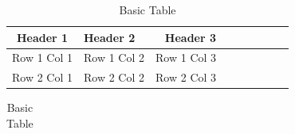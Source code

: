 \usepackage{tabularx}

\begin{table}[h] %
    
    \begin{tabular}{| %
            c| %
            l| %
            r| %
            p{3cm}| %
            m{3cm}| %
            b{3cm}| %
            >{\centering\arraybackslash}p{3cm}| %
            >{\raggedright\arraybackslash}p{3cm}| %
            >{\raggedleft\arraybackslash}p{3cm}| %
        }
        \hline %
        Header 1 & Header 2 & Header 3 \\ %
        \hline %
        Row 1 Col 1 & Row 1 Col 2 & Row 1 Col 3 \\ %
        Row 2 Col 1 & Row 2 Col 2 & Row 2 Col 3 \\ %
        \hline %
    \end{tabular}
    
    \begin{tabularx}{\textwidth}{|X|X|X|} %
    \end{tabularx} %
    
    \centering %
    \caption{Basic Table} %
    \label{tab:basic_table} %
\end{table} %
